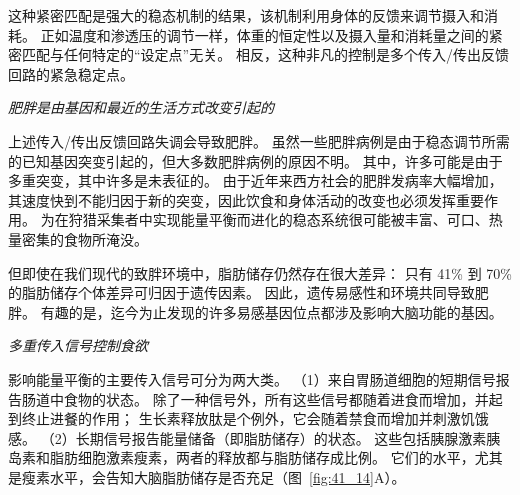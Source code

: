这种紧密匹配是强大的稳态机制的结果，该机制利用身体的反馈来调节摄入和消耗。
正如温度和渗透压的调节一样，体重的恒定性以及摄入量和消耗量之间的紧密匹配与任何特定的“设定点”无关。
相反，这种非凡的控制是多个传入/传出反馈回路的紧急稳定点。


\textit{肥胖是由基因和最近的生活方式改变引起的}

上述传入/传出反馈回路失调会导致肥胖。
虽然一些肥胖病例是由于稳态调节所需的已知基因突变引起的，但大多数肥胖病例的原因不明。
其中，许多可能是由于多重突变，其中许多是未表征的。
由于近年来西方社会的肥胖发病率大幅增加，其速度快到不能归因于新的突变，因此饮食和身体活动的改变也必须发挥重要作用。
为在狩猎采集者中实现能量平衡而进化的稳态系统很可能被丰富、可口、热量密集的食物所淹没。


但即使在我们现代的致胖环境中，脂肪储存仍然存在很大差异：
只有 41\% 到 70\% 的脂肪储存个体差异可归因于遗传因素。
因此，遗传易感性和环境共同导致肥胖。
有趣的是，迄今为止发现的许多易感基因位点都涉及影响大脑功能的基因。


\textit{多重传入信号控制食欲}

影响能量平衡的主要传入信号可分为两大类。
（1）来自胃肠道细胞的短期信号报告肠道中食物的状态。
除了一种信号外，所有这些信号都随着进食而增加，并起到终止进餐的作用；
生长素释放肽是个例外，它会随着禁食而增加并刺激饥饿感。
（2）长期信号报告能量储备（即脂肪储存）的状态。 
这些包括胰腺激素胰岛素和脂肪细胞激素瘦素，两者的释放都与脂肪储存成比例。
它们的水平，尤其是瘦素水平，会告知大脑脂肪储存是否充足（图~\ref{fig:41_14}A）。


